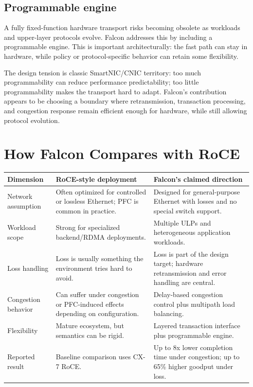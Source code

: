 \documentclass[11pt]{article}
\begin{document}
\subsection{Programmable engine}

A fully fixed-function hardware transport risks becoming obsolete as workloads and upper-layer protocols evolve. Falcon addresses this by including a programmable engine. This is important architecturally: the fast path can stay in hardware, while policy or protocol-specific behavior can retain some flexibility.

The design tension is classic SmartNIC/CNIC territory: too much programmability can reduce performance predictability; too little programmability makes the transport hard to adapt. Falcon's contribution appears to be choosing a boundary where retransmission, transaction processing, and congestion response remain efficient enough for hardware, while still allowing protocol evolution.

\section{How Falcon Compares with RoCE}

\begin{tabularx}{\textwidth}{@{}lXX@{}}
\toprule
\textbf{Dimension} & \textbf{RoCE-style deployment} & \textbf{Falcon's claimed direction} \\
\midrule
Network assumption & Often optimized for controlled or lossless Ethernet; PFC is common in practice. & Designed for general-purpose Ethernet with losses and no special switch support. \\
Workload scope & Strong for specialized backend/RDMA deployments. & Multiple ULPs and heterogeneous application workloads. \\
Loss handling & Loss is usually something the environment tries hard to avoid. & Loss is part of the design target; hardware retransmission and error handling are central. \\
Congestion behavior & Can suffer under congestion or PFC-induced effects depending on configuration. & Delay-based congestion control plus multipath load balancing. \\
Flexibility & Mature ecosystem, but semantics can be rigid. & Layered transaction interface plus programmable engine. \\
Reported result & Baseline comparison uses CX-7 RoCE. & Up to 8x lower completion time under congestion; up to 65\% higher goodput under loss. \\
\bottomrule
\end{tabularx}
\end{document}
